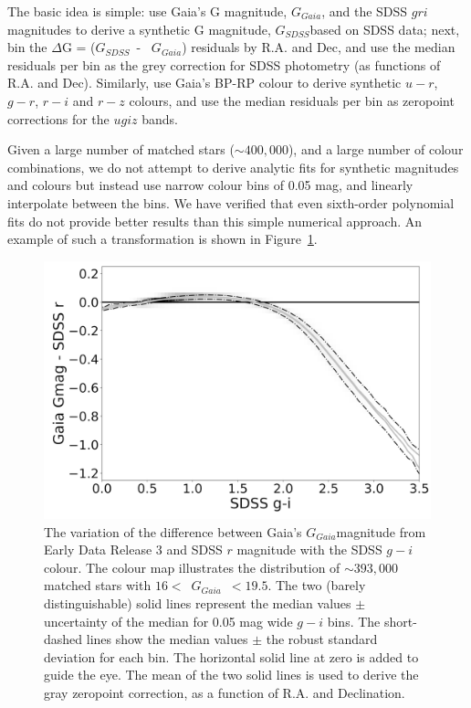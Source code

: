 \documentclass[fleqn,usenatbib]{mnras}
\newcommand{\GG}{\hbox{$G_{Gaia}$}}
\newcommand{\GS}{\hbox{$G_{SDSS}$}}
\begin{document}
The basic idea is simple: use Gaia's G magnitude, \GG, and the SDSS $gri$ magnitudes
to derive a synthetic G magnitude, \GS based on SDSS data; next, bin the 
$\Delta$G = (\GS~-~ \GG) residuals by R.A. and Dec, and 
use the median residuals per bin as the grey correction for SDSS photometry (as functions
of R.A. and Dec). Similarly, use Gaia's BP-RP colour to derive synthetic $u-r$, $g-r$, $r-i$
and $r-z$ colours, and use the median residuals per bin as zeropoint corrections for 
the $ugiz$ bands. 

Given a large number of matched stars ($\sim 400,000$), and a large number of colour combinations,
we do not attempt to derive analytic fits for synthetic magnitudes and colours but instead
use narrow colour bins of 0.05 mag, and linearly interpolate between the bins. We have verified
that even sixth-order polynomial fits do not provide better results than this simple 
numerical approach. An example of such a transformation is shown in Figure~\ref{fig:GrVSgi}. 


\begin{figure}
  \centering\includegraphics[width=0.95\columnwidth]{figures/GrVSgi_lr.png} 
\caption{The variation of the difference between Gaia's \GG magnitude from Early Data Release 3
and SDSS $r$ magnitude with the SDSS $g-i$ colour.
The  colour map illustrates the distribution of $\sim 393,000$ matched stars with 
$16<$~\GG~$<19.5$. The two (barely distinguishable) solid lines represent the median 
values $\pm$ uncertainty of the median for 0.05 mag wide $g-i$ bins. The short-dashed 
lines show the median values $\pm$ the robust standard deviation for 
each bin. The horizontal solid line at zero is added to guide the eye. The mean of 
the two solid lines is used to derive the gray zeropoint correction, as a function of R.A.
and Declination.}
\label{fig:GrVSgi}
\end{figure}
\end{document}

